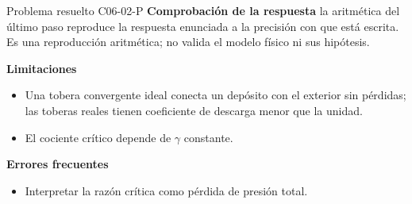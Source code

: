 \documentclass[10pt,openany]{book}
\begin{document}
\begin{studiumworked}{Problema resuelto C06-02-P}
\noindent\textbf{Comprobación de la respuesta} la aritmética del último paso reproduce la respuesta enunciada a la precisión con que está escrita. Es una reproducción aritmética; no valida el modelo físico ni sus hipótesis.

\noindent\textbf{Limitaciones}
\begin{itemize}
\item Una tobera convergente ideal conecta un depósito con el exterior sin pérdidas; las toberas reales tienen coeficiente de descarga menor que la unidad.
\item El cociente crítico depende de $\gamma$ constante.
\end{itemize}

\noindent\textbf{Errores frecuentes}
\begin{itemize}
\item Interpretar la razón crítica como pérdida de presión total.
\end{itemize}
\end{studiumworked}
\end{document}
